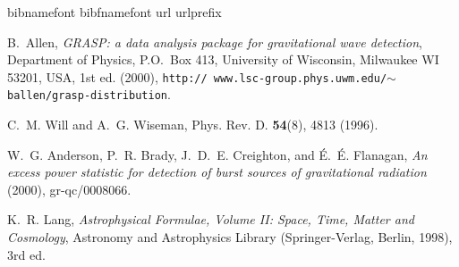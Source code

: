 \newpage\begin{thebibliography}{1}
\expandafter\ifx\csname bibnamefont\endcsname\relax
  \def\bibnamefont#1{#1}\fi
\expandafter\ifx\csname bibfnamefont\endcsname\relax
  \def\bibfnamefont#1{#1}\fi
\expandafter\ifx\csname url\endcsname\relax
  \def\url#1{\texttt{#1}}\fi
\expandafter\ifx\csname urlprefix\endcsname\relax\def\urlprefix{URL }\fi
\providecommand{\bibinfo}[2]{#2}
\providecommand{\eprint}[2][]{\url{#2}}

\bibinfo{author}{\bibfnamefont{B.}~\bibnamefont{Allen}},
  \emph{\bibinfo{title}{GRASP: a data analysis package for gravitational wave
  detection}}, \bibinfo{address}{Department of Physics, P.O.\ Box 413,
  University of Wisconsin, Milwaukee WI 53201, USA}, \bibinfo{edition}{1st} ed.
  (\bibinfo{year}{2000}), \bibinfo{note}{\texttt{http:\slash\slash
  www.lsc-group.phys.uwm.edu\slash$\sim$ballen\slash grasp-distribution}}.

\bibinfo{author}{\bibfnamefont{C.~M.} \bibnamefont{Will}} \bibnamefont{and}
  \bibinfo{author}{\bibfnamefont{A.~G.} \bibnamefont{Wiseman}},
  \bibinfo{journal}{Phys. Rev. D.}
  \textbf{\bibinfo{volume}{54}}(\bibinfo{number}{8}), \bibinfo{pages}{4813}
  (\bibinfo{year}{1996}).

\bibinfo{author}{\bibfnamefont{W.~G.} \bibnamefont{Anderson}},
  \bibinfo{author}{\bibfnamefont{P.~R.} \bibnamefont{Brady}},
  \bibinfo{author}{\bibfnamefont{J.~D.~E.} \bibnamefont{Creighton}},
  \bibnamefont{and} \bibinfo{author}{\bibfnamefont{\'E.~\'E.}
  \bibnamefont{Flanagan}}, \emph{\bibinfo{title}{An excess power statistic for
  detection of burst sources of gravitational radiation}}
  (\bibinfo{year}{2000}), \bibinfo{note}{gr-qc/0008066}.

\bibinfo{author}{\bibfnamefont{K.~R.} \bibnamefont{Lang}},
  \emph{\bibinfo{title}{Astrophysical Formulae, Volume II: Space, Time, Matter
  and Cosmology}}, Astronomy and Astrophysics Library
  (\bibinfo{publisher}{Springer-Verlag}, \bibinfo{address}{Berlin},
  \bibinfo{year}{1998}), \bibinfo{edition}{3rd} ed.


\end{thebibliography}
